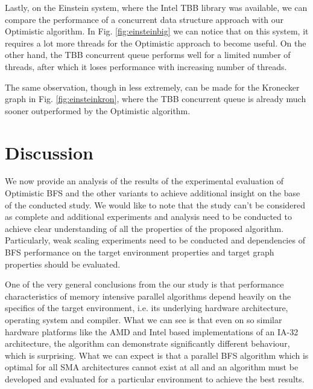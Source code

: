 \documentclass[letterpaper]{article}
\begin{document}
		Lastly, on the Einstein system, where the Intel TBB library was available, we can compare the performance of a concurrent data structure approach with our Optimistic algorithm.
		In Fig. \ref{fig:einsteinbig} we can notice that on this system, it requires a lot more threads for the Optimistic approach to become useful. On the other hand, the TBB concurrent queue performs well for a limited number of threads, after which it loses performance with increasing number of threads.
		
		The same observation, though in less extremely, can be made for the Kronecker graph in Fig. \ref{fig:einsteinkron}, where the TBB concurrent queue is already much sooner outperformed by the Optimistic algorithm.


	\section{Discussion}\label{sec:disc} %
		We now provide an analysis of the results of the experimental evaluation of Optimistic BFS and the other variants to achieve additional insight on the base of the conducted study.
		We would like to note that the study can't be considered as complete and additional experiments and analysis need to be conducted to achieve clear understanding of all the properties of the proposed algorithm.  
		Particularly, weak scaling experiments need to be conducted and dependencies of BFS performance on the target environment properties and target graph properties should be evaluated. 
		
		One of the very general conclusions from the our study is that performance characteristics of memory intensive parallel algorithms depend heavily on the specifics of the target environment, i.e. its underlying hardware architecture, operating system and compiler.
		What we can see is that even on so similar hardware platforms like the AMD and Intel based implementations of an IA-32 architecture, the algorithm can demonstrate significantly different behaviour, which is surprising.
		What we can expect is that a parallel BFS algorithm which is optimal for all SMA architectures cannot exist at all and an algorithm must be developed and evaluated for a particular environment to achieve the best results.
		
\end{document}

